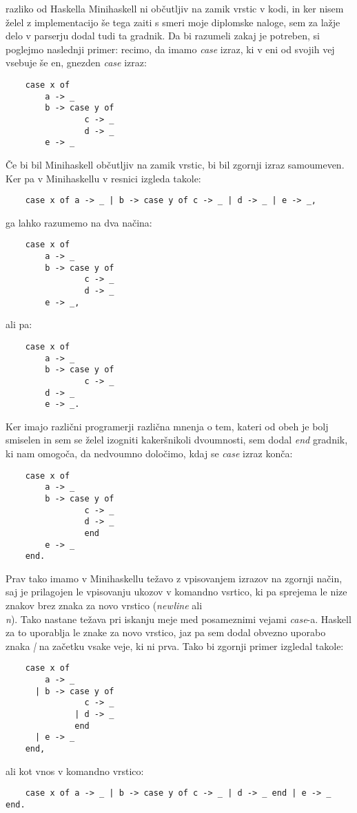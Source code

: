 \documentclass[12pt,a4paper,openany]{book}
\begin{document}
razliko od Haskella Minihaskell ni občutljiv na zamik vrstic v kodi, in ker nisem želel z implementacijo še tega zaiti s smeri moje diplomske naloge, sem za lažje delo v parserju 
dodal tudi ta gradnik. Da bi razumeli zakaj je potreben, si poglejmo naslednji primer: recimo, da imamo \emph{case} izraz, ki v eni od svojih vej vsebuje še en, gnezden \emph{case} 
izraz:
\begin{lstlisting}
    case x of 
        a -> _
        b -> case y of
                c -> _
                d -> _
        e -> _
\end{lstlisting}
Če bi bil Minihaskell občutljiv na zamik vrstic, bi bil zgornji izraz samoumeven. Ker pa v Minihaskellu v resnici izgleda takole:
\begin{lstlisting}
	case x of a -> _ | b -> case y of c -> _ | d -> _ | e -> _,
\end{lstlisting}
ga lahko razumemo na dva načina:
\begin{lstlisting}
    case x of 
        a -> _
        b -> case y of
                c -> _
                d -> _
        e -> _,
\end{lstlisting}
ali pa:
\begin{lstlisting}
    case x of 
        a -> _
        b -> case y of
                c -> _
        d -> _
        e -> _.
\end{lstlisting}
Ker imajo različni programerji različna mnenja o tem, kateri od obeh je bolj smiselen in sem se želel izogniti kakeršnikoli dvoumnosti, sem dodal 
\emph{end} gradnik, ki nam omogoča, da nedvoumno določimo, kdaj se \emph{case} izraz konča:
\begin{lstlisting}
    case x of 
        a -> _
        b -> case y of
                c -> _
                d -> _
                end
        e -> _
    end.
\end{lstlisting}
Prav tako imamo v Minihaskellu težavo z vpisovanjem izrazov na zgornji način, saj je prilagojen le vpisovanju ukozov v komandno vsrtico, ki pa 
sprejema le nize znakov brez znaka za novo vrstico (\emph{newline} ali \emph{\\n}). Tako nastane težava pri iskanju meje med posameznimi vejami
\emph{case}-a. Haskell za to uporablja le znake za novo vrstico, jaz pa sem dodal obvezno uporabo znaka \emph{|} na začetku vsake veje, ki ni prva.
Tako bi zgornji primer izgledal takole:
\begin{lstlisting}
	case x of 
		a -> _
	  | b -> case y of
				c -> _
			  | d -> _
			  end
	  | e -> _
	end,
\end{lstlisting}
ali kot vnos v komandno vrstico:
\begin{lstlisting}
	case x of a -> _ | b -> case y of c -> _ | d -> _ end | e -> _ end.
\end{lstlisting}
\end{document}
